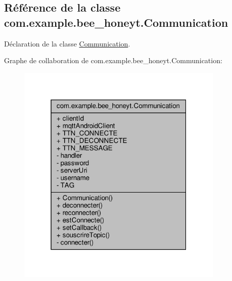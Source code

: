 \hypertarget{classcom_1_1example_1_1bee__honeyt_1_1_communication}{}\subsection{Référence de la classe com.\+example.\+bee\+\_\+honeyt.\+Communication}
\label{classcom_1_1example_1_1bee__honeyt_1_1_communication}


Déclaration de la classe \hyperlink{classcom_1_1example_1_1bee__honeyt_1_1_communication}{Communication}.  




Graphe de collaboration de com.\+example.\+bee\+\_\+honeyt.\+Communication\+:\nopagebreak
\begin{figure}[H]
\begin{center}
\leavevmode
\includegraphics[width=280pt]{classcom_1_1example_1_1bee__honeyt_1_1_communication__coll__graph}
\end{center}
\end{figure}
